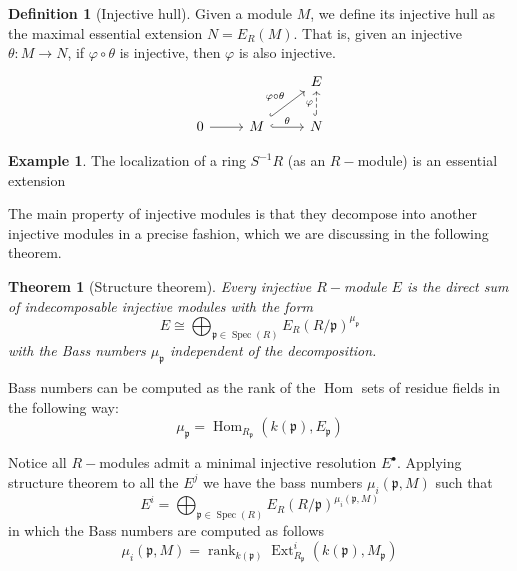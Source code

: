 \documentclass[leqno]{article}
\newtheorem{theorem}{Theorem}[section]
\theoremstyle{definition}
\newtheorem{definition}{Definition}[section]
\newtheorem{example}{Example}[section]
\DeclareMathOperator{\Hom}{Hom}
\DeclareMathOperator{\Ext}{Ext}
\DeclareMathOperator{\rank}{rank}
\DeclareMathOperator{\Spec}{Spec}
\begin{document}
\begin{definition}[Injective hull] Given a module $M$, we define its injective hull as the maximal essential extension $N = E_R(M)$. That is, given an injective $\theta :M\to N$, if $\varphi \circ \theta $  is injective, then $\varphi $ is also injective.
\[\begin{tikzcd}
	&& E \\
	0 & M & N
	\arrow[from=2-1, to=2-2]
	\arrow["\theta", hook, from=2-2, to=2-3]
	\arrow["\varphi", dashed, hook, from=2-3, to=1-3]
	\arrow["\varphi\circ\theta", hook, from=2-2, to=1-3]
\end{tikzcd}\]
\end{definition}

\begin{example} The localization of a ring $S^{-1}R$ (as an $R-$module) is an essential extension
\end{example}

The main property of injective modules is that they decompose into another injective modules in a precise fashion, which we are discussing in the following theorem.

\begin{theorem}[Structure theorem] Every injective $R-$module $E$ is the direct sum of indecomposable injective modules with the form
  \[
	E \cong \bigoplus _{\mathfrak{p}\in \Spec (R)} E_R( R / \mathfrak{p})^{\mu _{\mathfrak{p}}}
  \] 
with the \textit{Bass numbers} $\mu _{\mathfrak{p}}$ independent of the decomposition.
\end{theorem}

Bass numbers can be computed as the rank of the $\Hom$ sets of residue fields in the following way:
 \[
\mu _{\mathfrak{p}} =\Hom _{R_{\mathfrak{p}}}(k(\mathfrak{p}), E_{\mathfrak{p}})
\] 

Notice all $R-$modules admit a minimal injective resolution  $E^\bullet$. Applying structure theorem to all the $E^j$ we have the bass numbers  $\mu _i(\mathfrak{p}, M)$ such that 
\[
E^i = \bigoplus_{\mathfrak{p}\in \Spec (R)} E_R(R / \mathfrak{p}) ^{\mu _i(\mathfrak{p}, M)}
\] 
in which the Bass numbers are computed as follows
\[
  \mu _i(\mathfrak{p}, M) = \rank _{k(\mathfrak{p})}\Ext ^i_{R_{\mathfrak{p}}} (k(\mathfrak{p}), M_{\mathfrak{p}})
\] 
\end{document}
